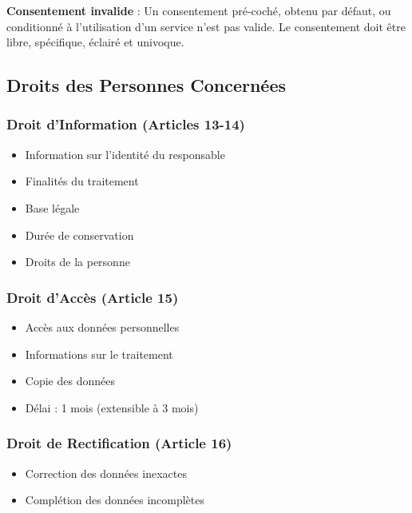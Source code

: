 \documentclass[11pt,a4paper]{article}
\begin{document}
\begin{dangerbox}
\textbf{Consentement invalide} : Un consentement pré-coché, obtenu par défaut, ou conditionné à l'utilisation d'un service n'est pas valide. Le consentement doit être libre, spécifique, éclairé et univoque.
\end{dangerbox}

\subsection{Droits des Personnes Concernées}

\subsubsection{Droit d'Information (Articles 13-14)}
\begin{itemize}
    \item Information sur l'identité du responsable
    \item Finalités du traitement
    \item Base légale
    \item Durée de conservation
    \item Droits de la personne
\end{itemize}

\subsubsection{Droit d'Accès (Article 15)}
\begin{itemize}
    \item Accès aux données personnelles
    \item Informations sur le traitement
    \item Copie des données
    \item Délai : 1 mois (extensible à 3 mois)
\end{itemize}

\subsubsection{Droit de Rectification (Article 16)}
\begin{itemize}
    \item Correction des données inexactes
    \item Complétion des données incomplètes
\end{itemize}
\end{document}
